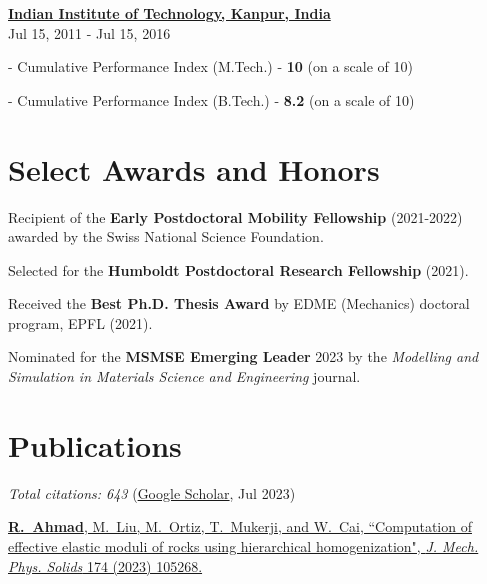 \documentclass[margin,line]{resume}
\begin{document}
\begin{resume}
    \textbf{\href{http://www.iitk.ac.in/}{\textsf{Indian Institute of Technology, Kanpur, India}}}\vspace{0mm}\\
     \hfill \small{Jul 15, 2011 - Jul 15, 2016}
    \vspace{-3mm}
    \begin{compactitem}
        \item[-] {Cumulative Performance Index (M.Tech.) - \textbf{10} (on a scale of 10)}
        \item[-] {Cumulative Performance Index (B.Tech.) - \textbf{8.2} (on a scale of 10)}
    \end{compactitem}%

    \section{\mysidestyle Select Awards and Honors}  \vspace{0mm}

    Recipient of the \textbf{Early Postdoctoral Mobility Fellowship} (2021-2022) awarded by the Swiss National Science Foundation.

    \vspace{-0.3cm}
    Selected for the \textbf{Humboldt Postdoctoral Research Fellowship} (2021).

    \vspace{-0.3cm}
    Received the \textbf{Best Ph.D. Thesis Award} by EDME (Mechanics) doctoral program, EPFL (2021).

    \vspace{-0.3cm}
    Nominated for the \textbf{MSMSE Emerging Leader} 2023 by the \textit{Modelling and Simulation in Materials Science and Engineering} journal.

    \section{\mysidestyle Publications}
    \small{\textit{Total citations: 643} (\href{https://scholar.google.ch/citations?user=ujjgd08AAAAJ&hl=en}{Google Scholar}, Jul 2023)}

    \href{https://www.sciencedirect.com/science/article/abs/pii/S0022509623000728?via%3Dihub}{\textbf{R.~Ahmad}, M.~Liu, M.~Ortiz, T.~Mukerji, and W.~Cai, ``Computation of effective elastic moduli of rocks using hierarchical homogenization", \textit{J. Mech. Phys. Solids} 174 (2023) 105268.}


\end{resume}
\end{document}
